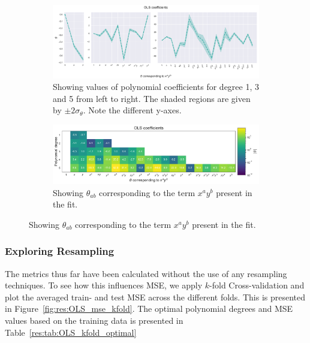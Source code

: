\documentclass[twocolumn,english,notitlepage]{article}
\begin{document}
            \begin{figure}
                \begin{subfigure}{\textwidth}
                    \centering
                    \includegraphics[width=\linewidth]{OLS_coefs_plots.pdf}
                    \caption{Showing values of polynomial coefficients for degree 1, 3 and 5 from left to right. The shaded regions are given by $\pm 2\sigma_\theta$. Note the different y-axes.} 
                    \label{fig:res:OLS_beta_values_plot}
                \end{subfigure}
                \begin{subfigure}{\textwidth}
                    \centering
                    \includegraphics[width=\linewidth]{OLS_coefs_table.pdf}
                    \caption{Showing $\theta_{ab}$ corresponding to the term $x^a y^b$ present in the fit.}
                    \label{fig:res:OLS_beta_values_table}    
                \end{subfigure}
            \end{figure} 

        \subsubsection*{Exploring Resampling}
            The metrics thus far have been calculated without the use of any resampling techniques. To see how this influences MSE, we apply $k$-fold Cross-validation and plot the averaged train- and test MSE across the different folds. This is presented in Figure~\ref{fig:res:OLS_mse_kfold}. The optimal polynomial degrees and MSE values based on the training data is presented in Table~\ref{res:tab:OLS_kfold_optimal}
\end{document}
